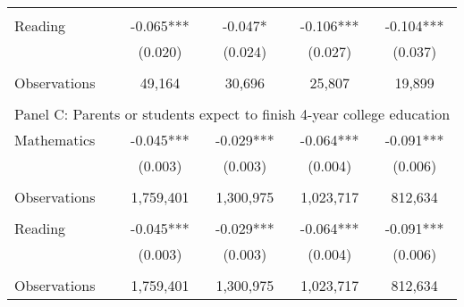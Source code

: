 {\begin{tabular}{lcccc}
&  &  & &  \\
Reading             &      -0.065***&      -0.047*  &      -0.106***&      -0.104***\\
                    &     (0.020)   &     (0.024)   &     (0.027)   &     (0.037)   \\
                    &               &               &               &               \\
Observations        &      49,164   &      30,696   &      25,807   &      19,899   \\
 
&  &  & &  \\
\multicolumn{5}{l}{Panel C: Parents or students expect to finish 4-year college education} \\
Mathematics         &      -0.045***&      -0.029***&      -0.064***&      -0.091***\\
                    &     (0.003)   &     (0.003)   &     (0.004)   &     (0.006)   \\
                    &               &               &               &               \\
Observations        &   1,759,401   &   1,300,975   &   1,023,717   &     812,634   \\
 
&  &  & &  \\
Reading             &      -0.045***&      -0.029***&      -0.064***&      -0.091***\\
                    &     (0.003)   &     (0.003)   &     (0.004)   &     (0.006)   \\
                    &               &               &               &               \\
Observations        &   1,759,401   &   1,300,975   &   1,023,717   &     812,634   \\
 

\bottomrule
\end{tabular}
}
